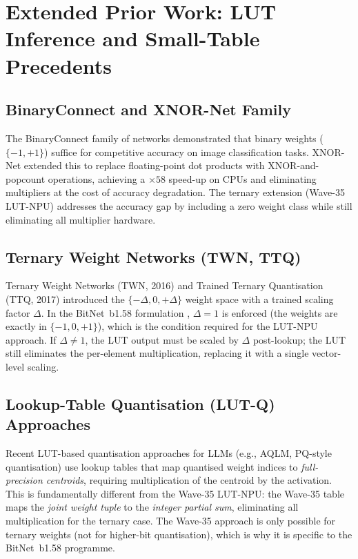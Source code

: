 \section{Extended Prior Work: LUT Inference and Small-Table Precedents}
\label{app:prior_extended}

\subsection{BinaryConnect and XNOR-Net Family}

The BinaryConnect family of networks \cite{bitnet_b158_2024} demonstrated
that binary weights ($\{-1, +1\}$) suffice for competitive accuracy on
image classification tasks.  XNOR-Net extended this to replace floating-point
dot products with XNOR-and-popcount operations, achieving a $\times 58$
speed-up on CPUs and eliminating multipliers at the cost of accuracy degradation.
The ternary extension (Wave-35 LUT-NPU) addresses the accuracy gap by including
a zero weight class while still eliminating all multiplier hardware.

\subsection{Ternary Weight Networks (TWN, TTQ)}

Ternary Weight Networks (TWN, 2016) and Trained Ternary Quantisation (TTQ,
2017) introduced the $\{-\Delta, 0, +\Delta\}$ weight space with a trained
scaling factor $\Delta$.  In the BitNet~b1.58 formulation \cite{bitnet_b158_2024},
$\Delta = 1$ is enforced (the weights are exactly in $\{-1, 0, +1\}$), which
is the condition required for the LUT-NPU approach.  If $\Delta \neq 1$, the
LUT output must be scaled by $\Delta$ post-lookup; the LUT still eliminates
the per-element multiplication, replacing it with a single vector-level scaling.

\subsection{Lookup-Table Quantisation (LUT-Q) Approaches}

Recent LUT-based quantisation approaches for LLMs (e.g., AQLM, PQ-style
quantisation) use lookup tables that map quantised weight indices to
\emph{full-precision centroids}, requiring multiplication of the centroid
by the activation.  This is fundamentally different from the Wave-35 LUT-NPU:
the Wave-35 table maps the \emph{joint weight tuple} to the \emph{integer
partial sum}, eliminating all multiplication for the ternary case.  The
Wave-35 approach is only possible for ternary weights (not for higher-bit
quantisation), which is why it is specific to the BitNet~b1.58 programme.

